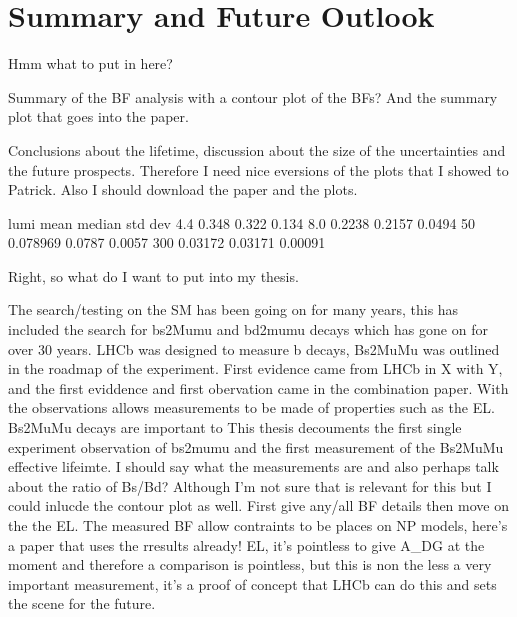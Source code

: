 \chapter{Summary and Future Outlook}

Hmm what to put in here?

Summary of the BF analysis with a contour plot of the BFs? And the summary plot that goes into the paper.

Conclusions about the lifetime, discussion about the size of the uncertainties and the future prospects. Therefore I need nice eversions of the plots that I showed to Patrick. Also I should download the paper and the plots.


lumi    mean    median    std dev
4.4     0.348   0.322     0.134
8.0     0.2238  0.2157    0.0494
50      0.078969 0.0787 0.0057
300    0.03172   0.03171 0.00091


Right, so what do I want to put into my thesis.


The search/testing on the SM has been going on for many years, this has included the search for bs2Mumu and bd2mumu decays which has gone on for over 30 years.
LHCb was designed to measure b decays, Bs2MuMu was outlined in the roadmap of the experiment. First evidence came from LHCb in X with Y, and the first eviddence and first obervation came in the combination paper. With the observations allows measurements to be made of properties such as the EL.
Bs2MuMu decays are important to 
This thesis decouments the first single experiment observation of bs2mumu and the first measurement of the Bs2MuMu effective lifeimte. I should say what the measurements are and also perhaps talk about the ratio of Bs/Bd? Although I'm not sure that is relevant for this but I could inlucde the contour plot as well. First give any/all BF details then move on the the EL. The measured BF allow contraints to be places on NP models, here's a paper that uses the rresults already! 
EL, it's pointless to give A_DG at the moment and therefore a comparison is pointless, but this is non the less a very important measurement, it's a proof of concept that LHCb can do this and sets the scene for the future.

